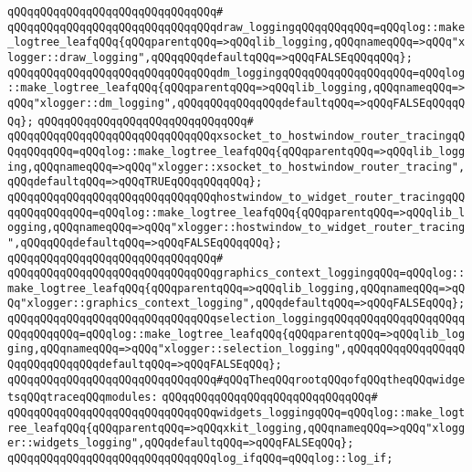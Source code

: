 \verb|qQQqqQQqqQQqqQQqqQQqqQQqqQQqqQQq#|\newline
\verb|qQQqqQQqqQQqqQQqqQQqqQQqqQQqqQQqdraw_loggingqQQqqQQqqQQq=qQQqlog::make_logtree_leafqQQq{qQQqparentqQQq=>qQQqlib_logging,qQQqnameqQQq=>qQQq"xlogger::draw_logging",qQQqqQQqdefaultqQQq=>qQQqFALSEqQQqqQQq};|\newline
\verb|qQQqqQQqqQQqqQQqqQQqqQQqqQQqqQQqdm_loggingqQQqqQQqqQQqqQQqqQQq=qQQqlog::make_logtree_leafqQQq{qQQqparentqQQq=>qQQqlib_logging,qQQqnameqQQq=>qQQq"xlogger::dm_logging",qQQqqQQqqQQqqQQqdefaultqQQq=>qQQqFALSEqQQqqQQq};|\newline
\verb|qQQqqQQqqQQqqQQqqQQqqQQqqQQqqQQq#|\newline
\verb|qQQqqQQqqQQqqQQqqQQqqQQqqQQqqQQqxsocket_to_hostwindow_router_tracingqQQqqQQqqQQq=qQQqlog::make_logtree_leafqQQq{qQQqparentqQQq=>qQQqlib_logging,qQQqnameqQQq=>qQQq"xlogger::xsocket_to_hostwindow_router_tracing",qQQqdefaultqQQq=>qQQqTRUEqQQqqQQqqQQq};|\newline
\verb|qQQqqQQqqQQqqQQqqQQqqQQqqQQqqQQqhostwindow_to_widget_router_tracingqQQqqQQqqQQqqQQq=qQQqlog::make_logtree_leafqQQq{qQQqparentqQQq=>qQQqlib_logging,qQQqnameqQQq=>qQQq"xlogger::hostwindow_to_widget_router_tracing",qQQqqQQqdefaultqQQq=>qQQqFALSEqQQqqQQq};|\newline
\verb|qQQqqQQqqQQqqQQqqQQqqQQqqQQqqQQq#|\newline
\verb|qQQqqQQqqQQqqQQqqQQqqQQqqQQqqQQqgraphics_context_loggingqQQq=qQQqlog::make_logtree_leafqQQq{qQQqparentqQQq=>qQQqlib_logging,qQQqnameqQQq=>qQQq"xlogger::graphics_context_logging",qQQqdefaultqQQq=>qQQqFALSEqQQq};|\newline
\verb|qQQqqQQqqQQqqQQqqQQqqQQqqQQqqQQqselection_loggingqQQqqQQqqQQqqQQqqQQqqQQqqQQqqQQq=qQQqlog::make_logtree_leafqQQq{qQQqparentqQQq=>qQQqlib_logging,qQQqnameqQQq=>qQQq"xlogger::selection_logging",qQQqqQQqqQQqqQQqqQQqqQQqqQQqqQQqdefaultqQQq=>qQQqFALSEqQQq};|\newline
\newline
\verb|qQQqqQQqqQQqqQQqqQQqqQQqqQQqqQQq#qQQqTheqQQqrootqQQqofqQQqtheqQQqwidgetsqQQqtraceqQQqmodules:|\newline
\verb|qQQqqQQqqQQqqQQqqQQqqQQqqQQqqQQq#|\newline
\verb|qQQqqQQqqQQqqQQqqQQqqQQqqQQqqQQqwidgets_loggingqQQq=qQQqlog::make_logtree_leafqQQq{qQQqparentqQQq=>qQQqxkit_logging,qQQqnameqQQq=>qQQq"xlogger::widgets_logging",qQQqdefaultqQQq=>qQQqFALSEqQQq};|\newline
\newline
\verb|qQQqqQQqqQQqqQQqqQQqqQQqqQQqqQQqlog_ifqQQq=qQQqlog::log_if;|\newline
